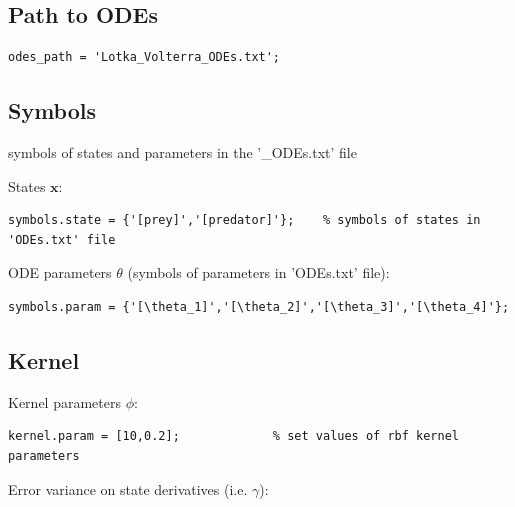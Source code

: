 \begin{par}
\subsection{ Path to ODEs }
\end{par} \vspace{1em}
\color{RoyalPurple}\begin{verbatim}
odes_path = 'Lotka_Volterra_ODEs.txt';
\end{verbatim}
\color{black}
\begin{par}
\subsection{ Symbols } symbols of states and parameters in the '\_ODEs.txt' file
\end{par} \vspace{1em}
\begin{par}
States $\mathbf{x}$:
\end{par} \vspace{1em}
\color{RoyalPurple}\begin{verbatim}
symbols.state = {'[prey]','[predator]'};    % symbols of states in 'ODEs.txt' file
\end{verbatim}
\color{black}
\begin{par}
ODE parameters $\theta$ (symbols of parameters in 'ODEs.txt' file):
\end{par} \vspace{1em}
\color{RoyalPurple}\begin{verbatim}
symbols.param = {'[\theta_1]','[\theta_2]','[\theta_3]','[\theta_4]'};
\end{verbatim}
\color{black}
\begin{par}
\subsection{ Kernel }
\end{par} \vspace{1em}
\begin{par}
Kernel parameters $\phi$:
\end{par} \vspace{1em}
\color{RoyalPurple}\begin{verbatim}
kernel.param = [10,0.2];             % set values of rbf kernel parameters
\end{verbatim}
\color{black}
\begin{par}
Error variance on state derivatives (i.e. $\gamma$):
\end{par} \vspace{1em}
